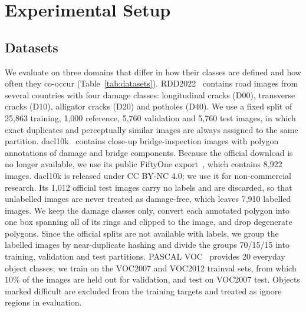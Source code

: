 \documentclass[conference]{IEEEtran}
\begin{document}
\section{Experimental Setup}
\label{sec:setup}

\subsection{Datasets}
\label{sec:setup_data}

We evaluate on three domains that differ in how their classes are defined and how often they co-occur (Table~\ref{tab:datasets}). RDD2022~\cite{arya2024rdd} contains road images from several countries with four damage classes: longitudinal cracks (D00), transverse cracks (D10), alligator cracks (D20) and potholes (D40). We use a fixed split of 25,863 training, 1,000 reference, 5,760 validation and 5,760 test images, in which exact duplicates and perceptually similar images are always assigned to the same partition. dacl10k~\cite{flotzinger2024dacl10k} contains close-up bridge-inspection images with polygon annotations of damage and bridge components. Because the official download is no longer available, we use its public FiftyOne export~\cite{voxel51dacl10k}, which contains 8,922 images. dacl10k is released under CC BY-NC 4.0; we use it for non-commercial research. Its 1,012 official test images carry no labels and are discarded, so that unlabelled images are never treated as damage-free, which leaves 7,910 labelled images. We keep the damage classes only, convert each annotated polygon into one box spanning all of its rings and clipped to the image, and drop degenerate polygons. Since the official splits are not available with labels, we group the labelled images by near-duplicate hashing and divide the groups 70/15/15 into training, validation and test partitions. PASCAL VOC~\cite{everingham2010voc} provides 20 everyday object classes; we train on the VOC2007 and VOC2012 trainval sets, from which 10\% of the images are held out for validation, and test on VOC2007 test. Objects marked difficult are excluded from the training targets and treated as ignore regions in evaluation.
\end{document}

